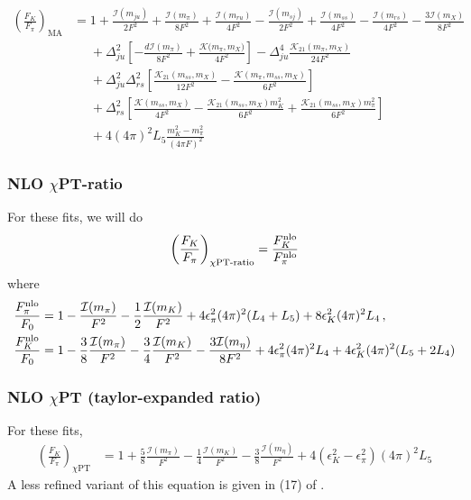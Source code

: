 \documentclass[prd,tightenlines,preprintnumbers,showpacs,superscriptaddress,notitlepage,eqsecnum,floatfix,notitlepage]{revtex4-1}
\begin{document}
\begin{align}\label{eq:fkfpi_ma}
\left(\frac{F_K}{F_\pi}\right)_\text{MA} &= 1
+\frac{\mathcal{I}(m_{ju})}{2F^2}
+\frac{\mathcal{I}(m_\pi)}{8F^2}
+\frac{\mathcal{I}(m_{ru})}{4F^2}
-\frac{\mathcal{I}(m_{sj})}{2F^2}
+\frac{\mathcal{I}(m_{ss})}{4F^2}
-\frac{\mathcal{I}(m_{rs})}{4F^2}
-\frac{3\mathcal{I}(m_X)}{8F^2}
\nonumber\\&\phantom{=}
+\Delta_{ju}^2 \left[ -\frac{d\mathcal{I}(m_\pi)}{8F^2} + \frac{\mathcal{K(}m_\pi,m_X)}{4F^2} \right]
-\Delta_{ju}^4 \frac{\mathcal{K}_{21}(m_\pi,m_X)}{24 F^2}
\nonumber\\&\phantom{=}
+\Delta_{ju}^2\Delta_{rs}^2 \left[ \frac{\mathcal{K}_{21}(m_{ss},m_X)}{12F^2}
-\frac{\mathcal{K}(m_\pi, m_{ss}, m_X)}{6F^2}
 \right]
\nonumber\\&\phantom{=}
+\Delta_{rs}^2 \left[
\frac{\mathcal{K}(m_{ss},m_X)}{4F^2}
-\frac{\mathcal{K}_{21}(m_{ss},m_X) m_K^2}{6F^2}
+\frac{\mathcal{K}_{21}(m_{ss},m_X) m_\pi^2}{6F^2}
\right]
\nonumber\\&\phantom{=}
+ 4 (4\pi)^2 L_5 \frac{m_K^2 - m_\pi^2}{(4\pi F)^2}
\end{align}

\subsubsection{NLO $\chi$PT-ratio}
For these fits, we will do
\begin{equation}
\left(\frac{F_K}{F_\pi}\right)_\text{$\chi$PT-ratio} = \frac{F_K^{\rm nlo}}{F_\pi^{\rm nlo}}
\end{equation}
where
\begin{align}
\frac{F_\pi^{\rm nlo}}{F_0} &= 1
- \frac{\mathcal{I}(m_\pi)}{F^2}
-\frac{1}{2}\frac{\mathcal{I}(m_K)}{F^2}
+4 \epsilon_\pi^2 (4\pi)^2 (L_4 + L_5)
+8 \epsilon_K^2 (4\pi)^2 L_4 \, , \\
\frac{F_K^{\rm nlo}}{F_0} &= 1
-\frac{3}{8}\frac{\mathcal{I}(m_\pi)}{F^2}
-\frac{3}{4}\frac{\mathcal{I}(m_K)}{F^2}
-\frac{3\mathcal{I}(m_\eta)}{8F^2}
+4\epsilon_\pi^2 (4 \pi)^2  L_4 + 4\epsilon_K^2 (4 \pi)^2  (L_5 + 2L_4)
\end{align}


\subsubsection{NLO $\chi$PT (taylor-expanded ratio)}
For these fits,
\begin{align}\label{eq:fkfpi_chpt}
\left(\frac{F_K}{F_\pi}\right)_\text{$\chi$PT} &= 1
+\frac{5}{8} \frac{\mathcal{I}(m_\pi)}{F^2}
-\frac{1}{4} \frac{\mathcal{I}(m_K)}{F^2}
-\frac{3}{8} \frac{\mathcal{I}(m_\eta)}{F^2}
+4(\epsilon_K^2 - \epsilon_\pi^2) (4\pi)^2 L_5
\end{align}
A less refined variant of this equation is given in (17) of \cite{Berkowitz:2017opd}.
\end{document}
